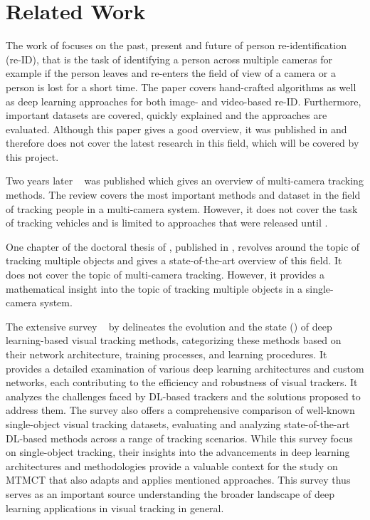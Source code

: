 \section{Related Work}\label{sec:related_work}
The work of \textcite{Zheng16c} focuses on the past, present and future of person re-identification (re-ID), that is the task of identifying a person across multiple cameras for example if the person leaves and re-enters the field of view of a camera or a person is lost for a short time. The paper covers hand-crafted algorithms as well as deep learning approaches for both image- and video-based re-ID. Furthermore, important datasets are covered, quickly explained and the approaches are evaluated. Although this paper gives a good overview, it was published in \citeyear{Zheng16c} and therefore does not cover the latest research in this field, which will be covered by this project.

Two years later ~\cite{Iguernaissi18} was published which gives an overview of multi-camera tracking methods. The review covers the most important methods and dataset in the field of tracking people in a multi-camera system. However, it does not cover the task of tracking vehicles and is limited to approaches that were released until \citeyear{Iguernaissi18}.

One chapter of the doctoral thesis of \textcite[Chapter 5]{Tian19}, published in \citeyear{Tian19}, revolves around the topic of tracking multiple objects and gives a state-of-the-art overview of this field. It does not cover the topic of multi-camera tracking. However, it provides a mathematical insight into the topic of tracking multiple objects in a single-camera system.

The extensive survey ~\cite{Zadeh21} by \citeauthor{Zadeh21} delineates the evolution and the state (\citeyear{Zadeh21}) of deep learning-based visual tracking methods, categorizing these methods based on their network architecture, training processes, and learning procedures. It provides a detailed examination of various deep learning architectures and custom networks, each contributing to the efficiency and robustness of visual trackers. It analyzes the challenges faced by DL-based trackers and the solutions proposed to address them. The survey also offers a comprehensive comparison of well-known single-object visual tracking datasets, evaluating and analyzing state-of-the-art DL-based methods across a range of tracking scenarios. While this survey focus on single-object tracking, their insights into the advancements in deep learning architectures and methodologies provide a valuable context for the study on MTMCT that also adapts and applies mentioned approaches. This survey thus serves as an important source understanding the broader landscape of deep learning applications in visual tracking in general.

